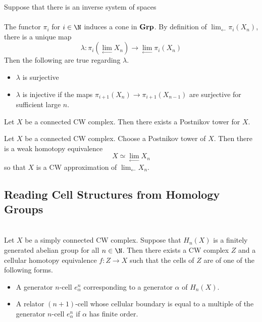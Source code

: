 \documentclass[a4paper]{article}
\begin{document}
\begin{thm}{}{} Suppose that there is an inverse system of spaces \\
\\
The functor $\pi_i$ for $i\in\N$ induces a cone in $\bold{Grp}$. By definition of $\lim_{\leftarrow}\pi_i(X_n)$, there is a unique map $$\lambda:\pi_i\left(\lim_{\leftarrow}X_n\right)\to\lim_{\leftarrow}\pi_i(X_n)$$ Then the following are true regarding $\lambda$. 
\begin{itemize}
\item $\lambda$ is surjective
\item $\lambda$ is injective if the maps $\pi_{i+1}(X_n)\to\pi_{i+1}(X_{n-1})$ are surjective for sufficient large $n$. 
\end{itemize}
\end{thm}

\begin{prp}{}{} Let $X$ be a connected CW complex. Then there exists a Postnikov tower for $X$. 
\end{prp}

\begin{prp}{}{} Let $X$ be a connected CW complex. Choose a Postnikov tower of $X$. Then there is a weak homotopy equivalence $$X\simeq\lim_{\leftarrow}X_n$$ so that $X$ is a CW approximation of $\lim_{\leftarrow}X_n$. 
\end{prp}

\subsection{Reading Cell Structures from Homology Groups}
\begin{prp}{}{}\\
Let $X$ be a simply connected CW complex. Suppose that $H_n(X)$ is a finitely generated abelian group for all $n\in\N$. Then there exists a CW complex $Z$ and a cellular homotopy equivalence $f:Z\to X$ such that the cells of $Z$ are of one of the following forms. 
\begin{itemize}
\item A generator $n$-cell $e_\alpha^n$ corresponding to a generator $\alpha$ of $H_n(X)$. 
\item A relator $(n+1)$-cell whose cellular boundary is equal to a multiple of the generator $n$-cell $e_\alpha^n$ if $\alpha$ has finite order. 
\end{itemize}
\end{prp}
\end{document}
